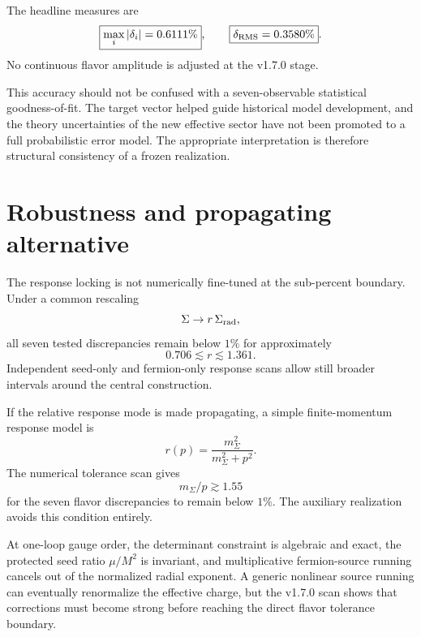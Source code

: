\documentclass[11pt]{article}
\begin{document}
The headline measures are
\begin{equation}
\boxed{\max_i |\delta_i|=0.6111\%},
\qquad
\boxed{\delta_{\rm RMS}=0.3580\%}.
\end{equation}
No continuous flavor amplitude is adjusted at the v1.7.0 stage.

This accuracy should not be confused with a seven-observable statistical goodness-of-fit. The target vector helped guide historical model development, and the theory uncertainties of the new effective sector have not been promoted to a full probabilistic error model. The appropriate interpretation is therefore structural consistency of a frozen realization.

\section{Robustness and propagating alternative}

The response locking is not numerically fine-tuned at the sub-percent boundary. Under a common rescaling
\begin{equation}
\Sigma\rightarrow r\,\Sigma_{\rm rad},
\end{equation}
all seven tested discrepancies remain below $1\%$ for approximately
\begin{equation}
0.706\lesssim r\lesssim1.361.
\end{equation}
Independent seed-only and fermion-only response scans allow still broader intervals around the central construction.

If the relative response mode is made propagating, a simple finite-momentum response model is
\begin{equation}
r(p)=\frac{m_\Sigma^2}{m_\Sigma^2+p^2}.
\end{equation}
The numerical tolerance scan gives
\begin{equation}
\boxed{m_\Sigma/p\gtrsim1.55}
\end{equation}
for the seven flavor discrepancies to remain below $1\%$. The auxiliary realization avoids this condition entirely.

At one-loop gauge order, the determinant constraint is algebraic and exact, the protected seed ratio $\mu/M^2$ is invariant, and multiplicative fermion-source running cancels out of the normalized radial exponent. A generic nonlinear source running can eventually renormalize the effective charge, but the v1.7.0 scan shows that corrections must become strong before reaching the direct flavor tolerance boundary.
\end{document}
